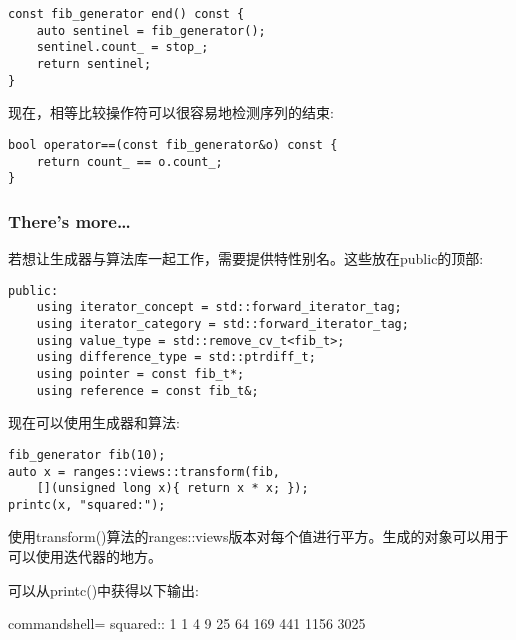 \begin{lstlisting}[style=styleCXX]
const fib_generator end() const {
	auto sentinel = fib_generator();
	sentinel.count_ = stop_;
	return sentinel;
}
\end{lstlisting}

现在，相等比较操作符可以很容易地检测序列的结束:

\begin{lstlisting}[style=styleCXX]
bool operator==(const fib_generator&o) const {
	return count_ == o.count_;
}
\end{lstlisting}

\subsubsection{There's more…}

若想让生成器与算法库一起工作，需要提供特性别名。这些放在public的顶部:

\begin{lstlisting}[style=styleCXX]
public:
	using iterator_concept = std::forward_iterator_tag;
	using iterator_category = std::forward_iterator_tag;
	using value_type = std::remove_cv_t<fib_t>;
	using difference_type = std::ptrdiff_t;
	using pointer = const fib_t*;
	using reference = const fib_t&;
\end{lstlisting}

现在可以使用生成器和算法:

\begin{lstlisting}[style=styleCXX]
fib_generator fib(10);
auto x = ranges::views::transform(fib,
	[](unsigned long x){ return x * x; });
printc(x, "squared:");
\end{lstlisting}

使用transform()算法的ranges::views版本对每个值进行平方。生成的对象可以用于可以使用迭代器的地方。

可以从printc()中获得以下输出:

\begin{tcblisting}{commandshell={}}
squared:: 1 1 4 9 25 64 169 441 1156 3025
\end{tcblisting}

